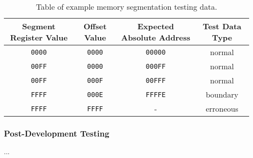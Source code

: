         \begin{table}
            \begin{tabular}{ | c | c | c | c | }
                \hline
                Segment Register Value & Offset Value & Expected Absolute Address & Test Data Type \\
                \hline
                \texttt{0000} & \texttt{0000} & \texttt{00000} & normal \\
                \texttt{00FF} & \texttt{0000} & \texttt{000FF} & normal \\
                \texttt{00FF} & \texttt{000F} & \texttt{00FFF} & normal \\
                \texttt{FFFF} & \texttt{000E} & \texttt{FFFFE} & boundary \\
                \texttt{FFFF} & \texttt{FFFF} & - & erroneous \\
                \hline
            \end{tabular}
            \caption{Table of example memory segmentation testing data.}
            \label{table:segmentation-test-data}
        \end{table}

    \subsubsection{Post-Development Testing}
        ...
